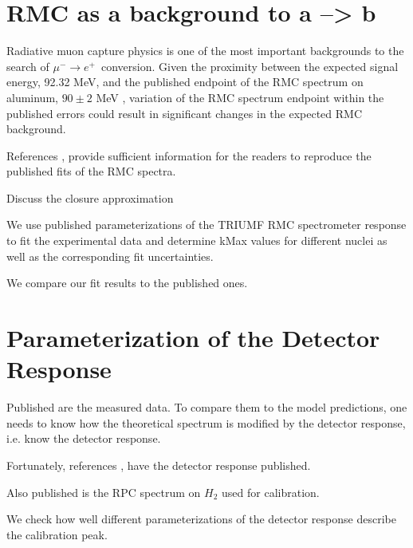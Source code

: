 \documentclass[12pt]{article}
\newcommand {\MuMinusEPlus} {\mbox{$\mu^- \rightarrow e^+$}}
\begin{document}
\section{ RMC as a background to a --> b }
% 
% 

Radiative muon capture physics is one of the most important backgrounds to the search
of \MuMinusEPlus\ conversion. Given the proximity between the expected signal energy,
92.32 MeV, and the published endpoint of the RMC spectrum on aluminum, $90 \pm 2$ MeV
\cite{RMC_1999_PhysRevC.59.2853}, variation of the RMC spectrum endpoint within the
published errors could result in significant changes in the expected RMC background.

References \cite{RMC_1992_PhysRevC.46.1094}, \cite{RMC_1999_PhysRevC.59.2853} provide
sufficient information for the readers to reproduce the published fits of the
RMC spectra.

Discuss the closure approximation

We use published parameterizations of the TRIUMF RMC spectrometer response
to fit the experimental data and determine kMax values for different nuclei
as well as the corresponding fit uncertainties.

We compare our fit results to the published ones.

\section { Parameterization of the Detector Response}


Published are the measured data. To compare them to the model predictions,
one needs to know how the theoretical spectrum is modified by the detector
response, i.e. know the detector response.

Fortunately, references  \cite{RMC_1992_PhysRevC.46.1094}, \cite{RMC_1999_PhysRevC.59.2853}
have the detector response published.

Also published is the RPC spectrum on $H_2$ used for calibration.

We check how well different parameterizations of the detector response describe the
calibration peak.
\end{document}
